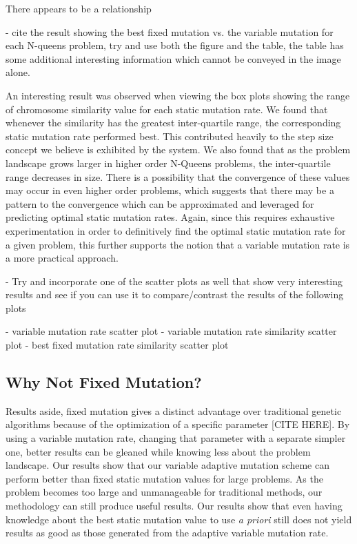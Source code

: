 \documentclass{sig-alternate}
\begin{document}
There appears to be a relationship 

- cite the result showing the best fixed mutation vs. the variable mutation
  for each N-queens problem, try and use both the figure and the table, the table
  has some additional interesting information which cannot be conveyed in the
  image alone.

An interesting result was observed when viewing the box plots showing the range of chromosome similarity value for each static mutation rate. We found that whenever the similarity has the greatest inter-quartile range, the corresponding static mutation rate performed best. This contributed heavily to the step size concept we believe is exhibited by the system. We also found that as the problem landscape grows larger in higher order N-Queens problems, the inter-quartile range decreases in size. There is a possibility that the convergence of these values may occur in even higher order problems, which suggests that there may be a pattern to the convergence which can be approximated and leveraged for predicting optimal static mutation rates. Again, since this requires exhaustive experimentation in order to definitively find the optimal static mutation rate for a given problem, this further supports the notion that a variable mutation rate is a more practical approach.

- Try and incorporate one of the scatter plots as well that show very interesting
  results and see if you can use it to compare/contrast the results of the 
  following plots
  
    - variable mutation rate scatter plot
    - variable mutation rate similarity scatter plot
    - best fixed mutation rate similarity scatter plot

\subsection{Why Not Fixed Mutation?}
Results aside, fixed mutation gives a distinct advantage over traditional genetic algorithms because of the optimization of a specific parameter [CITE HERE]. By using a variable mutation rate, changing that parameter with a separate simpler one, better results can be gleaned while knowing less about the problem landscape. Our results show that our variable adaptive mutation scheme can perform better than fixed static mutation values for large problems. As the problem becomes too large and unmanageable for traditional methods, our methodology can still produce useful results. Our results show that even having knowledge about the best static mutation value to use \emph{a priori} still does not yield results as good as those generated from the adaptive variable mutation rate.
\end{document}
